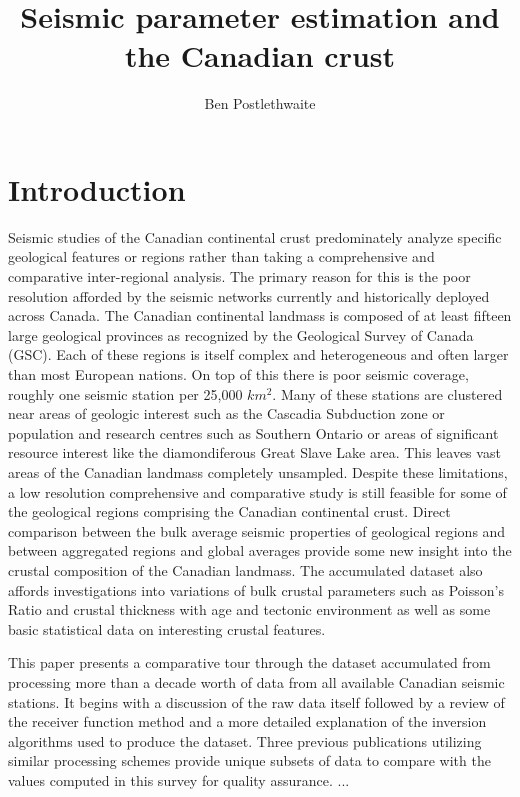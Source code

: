 \documentclass[draft, 12pt]{article}
\title{Seismic parameter estimation and the Canadian crust}
\author{Ben Postlethwaite}
\begin{document}
\begin{abstract}

\end{abstract}

\section{Introduction}

Seismic studies of the Canadian continental crust predominately analyze specific geological features or regions rather than taking a comprehensive and comparative inter-regional analysis. The primary reason for this is the poor resolution afforded by the seismic networks currently and historically deployed across Canada. The Canadian continental landmass is composed of at least fifteen large geological provinces as recognized by the Geological Survey of Canada (GSC). Each of these regions is itself complex and heterogeneous and often larger than most European nations. On top of this there is poor seismic coverage, roughly one seismic station per 25,000 $km^2$. Many of these stations are clustered near areas of geologic interest such as the Cascadia Subduction zone or population and research centres such as Southern Ontario or areas of significant resource interest like the diamondiferous Great Slave Lake area. This leaves vast areas of the Canadian landmass completely unsampled. Despite these limitations, a low resolution comprehensive and comparative study is still feasible for some of the geological regions comprising the Canadian continental crust. Direct comparison between the bulk average seismic properties of geological regions and between aggregated regions and global averages provide some new insight into the crustal composition of the Canadian landmass. The accumulated dataset also affords investigations into variations of bulk crustal parameters such as Poisson's Ratio and crustal thickness with age and tectonic environment as well as some basic statistical data on interesting crustal features.

This paper presents a comparative tour through the dataset accumulated from processing more than a decade worth of data from all available Canadian seismic stations. It begins with a discussion of the raw data itself followed by a review of the receiver function method and a more detailed explanation of the inversion algorithms used to produce the dataset. Three previous publications utilizing similar processing schemes provide unique subsets of data to compare with the values computed in this survey for quality assurance. ...
\end{document}
